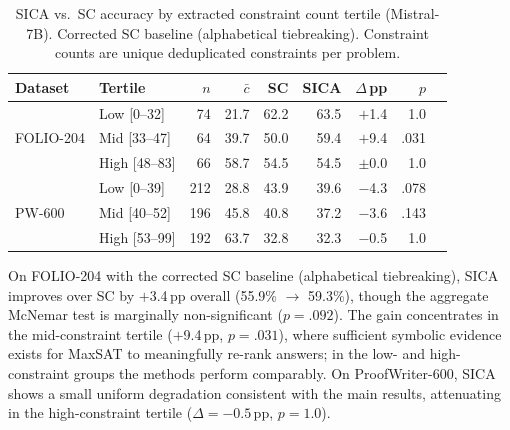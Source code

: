 \begin{table}[h]
\centering
\small
\caption{SICA vs.\ SC accuracy by extracted constraint count tertile (Mistral-7B). Corrected SC baseline (alphabetical tiebreaking). Constraint counts are unique deduplicated constraints per problem.}
\label{tab:subpop-constraint}
\begin{tabular}{ll rr rrr rr}
\toprule
\textbf{Dataset} & \textbf{Tertile} & $n$ & $\bar{c}$ & \textbf{SC} & \textbf{SICA} & $\Delta$\,pp & $p$ \\
\midrule
\multirow{3}{*}{FOLIO-204}
 & Low \scriptsize{[0--32]}   &  74 & 21.7 & 62.2 & 63.5 & $+$1.4 & 1.0\hphantom{00} \\
 & Mid \scriptsize{[33--47]}  &  64 & 39.7 & 50.0 & 59.4 & $+$9.4 & .031\rlap{*} \\
 & High \scriptsize{[48--83]} &  66 & 58.7 & 54.5 & 54.5 & $\pm$0.0 & 1.0\hphantom{00} \\
\midrule
\multirow{3}{*}{PW-600}
 & Low \scriptsize{[0--39]}   & 212 & 28.8 & 43.9 & 39.6 & $-$4.3 & .078 \\
 & Mid \scriptsize{[40--52]}  & 196 & 45.8 & 40.8 & 37.2 & $-$3.6 & .143 \\
 & High \scriptsize{[53--99]} & 192 & 63.7 & 32.8 & 32.3 & $-$0.5 & 1.0\hphantom{00} \\
\bottomrule
\end{tabular}
\end{table}

On FOLIO-204 with the corrected SC baseline (alphabetical tiebreaking), SICA improves over SC by $+$3.4\,pp overall (55.9\% $\to$ 59.3\%), though the aggregate McNemar test is marginally non-significant ($p{=}.092$).
The gain concentrates in the mid-constraint tertile ($+$9.4\,pp, $p{=}.031$), where sufficient symbolic evidence exists for MaxSAT to meaningfully re-rank answers; in the low- and high-constraint groups the methods perform comparably.
On ProofWriter-600, SICA shows a small uniform degradation consistent with the main results, attenuating in the high-constraint tertile ($\Delta{=}{-}0.5$\,pp, $p{=}1.0$).

